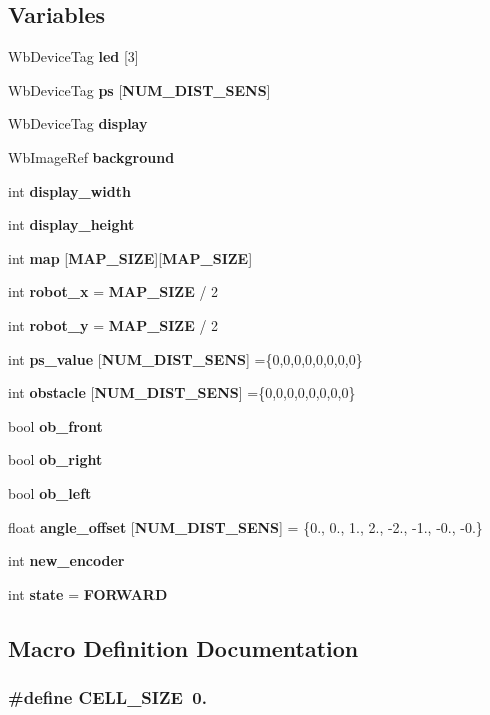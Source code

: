 \subsection*{Variables}
\begin{DoxyCompactItemize}
\item 
Wb\-Device\-Tag {\bf led} [3]
\item 
Wb\-Device\-Tag {\bf ps} [{\bf N\-U\-M\-\_\-\-D\-I\-S\-T\-\_\-\-S\-E\-N\-S}]
\item 
Wb\-Device\-Tag {\bf display}
\item 
Wb\-Image\-Ref {\bf background}
\item 
int {\bf display\-\_\-width}
\item 
int {\bf display\-\_\-height}
\item 
int {\bf map} [{\bf M\-A\-P\-\_\-\-S\-I\-Z\-E}][{\bf M\-A\-P\-\_\-\-S\-I\-Z\-E}]
\item 
int {\bf robot\-\_\-x} = {\bf M\-A\-P\-\_\-\-S\-I\-Z\-E} / 2
\item 
int {\bf robot\-\_\-y} = {\bf M\-A\-P\-\_\-\-S\-I\-Z\-E} / 2
\item 
int {\bf ps\-\_\-value} [{\bf N\-U\-M\-\_\-\-D\-I\-S\-T\-\_\-\-S\-E\-N\-S}] =\{0,0,0,0,0,0,0,0\}
\item 
int {\bf obstacle} [{\bf N\-U\-M\-\_\-\-D\-I\-S\-T\-\_\-\-S\-E\-N\-S}] =\{0,0,0,0,0,0,0,0\}
\item 
bool {\bf ob\-\_\-front}
\item 
bool {\bf ob\-\_\-right}
\item 
bool {\bf ob\-\_\-left}
\item 
float {\bf angle\-\_\-offset} [{\bf N\-U\-M\-\_\-\-D\-I\-S\-T\-\_\-\-S\-E\-N\-S}] = \{0., 0., 1., 2., -\/2., -\/1., -\/0., -\/0.\}
\item 
int {\bf new\-\_\-encoder}
\item 
int {\bf state} = {\bf F\-O\-R\-W\-A\-R\-D}
\end{DoxyCompactItemize}


\subsection{Macro Definition Documentation}
\subsubsection[{C\-E\-L\-L\-\_\-\-S\-I\-Z\-E}]{\setlength{\rightskip}{0pt plus 5cm}\#define C\-E\-L\-L\-\_\-\-S\-I\-Z\-E~0.}\label{map__building_8c_a7a4127f14f16563da90eb3c836bc404f}
